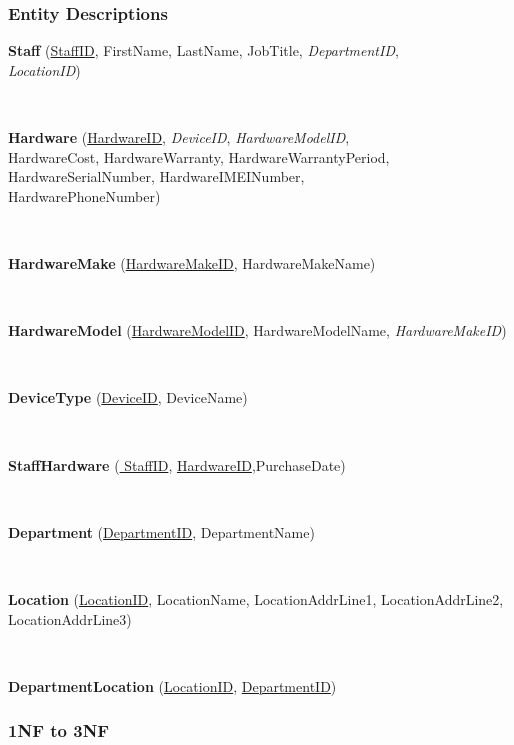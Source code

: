 \subsubsection{Entity Descriptions}


\textbf{Staff}  (\underline{StaffID}, FirstName, LastName, JobTitle, \textit{DepartmentID},\\ \textit{ LocationID})


\

\textbf{Hardware}  (\underline{HardwareID}, \textit{DeviceID},  \textit{HardwareModelID},\\ HardwareCost, HardwareWarranty, HardwareWarrantyPeriod,\\ HardwareSerialNumber, 		HardwareIMEINumber, \\HardwarePhoneNumber)

\

\textbf{HardwareMake} (\underline{HardwareMakeID}, HardwareMakeName)

\

\textbf{HardwareModel} (\underline{HardwareModelID}, HardwareModelName, \textit{HardwareMakeID})

\


\textbf{DeviceType}  (\underline{DeviceID}, DeviceName)


\


\textbf{StaffHardware}  (\underline{ StaffID}, \underline{ HardwareID},PurchaseDate)


\


\textbf{Department}  (\underline{DepartmentID}, DepartmentName)


\


\textbf{Location}  (\underline{LocationID}, LocationName, LocationAddrLine1, LocationAddrLine2, LocationAddrLine3)

\

\textbf{DepartmentLocation} (\underline{LocationID}, \underline{DepartmentID})




\subsubsection{1NF to 3NF}

